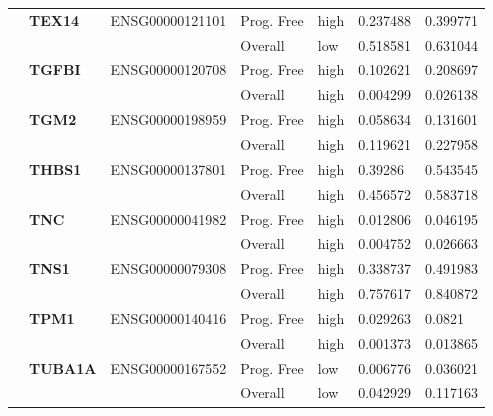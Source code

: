 \begin{spacing}{1}
{\begin{longtable}{|>{\bfseries}p{2cm}|>{\bfseries}p{1.9cm}|p{2.8cm}|p{2cm}|p{2cm}|p{1.5cm}|p{1.5cm}|}
             & TEX14    & ENSG00000121101 & Prog. Free & high & 0.237488 & 0.399771                \\
            \hhline{~~~----}
             &          &                 & Overall    & low  & 0.518581 & 0.631044                \\
            \hhline{~======}
             & TGFBI    & ENSG00000120708 & Prog. Free & high & 0.102621 & 0.208697                \\
            \hhline{~~~----}
             &          &                 & Overall    & high & 0.004299 & 0.026138                \\
            \hhline{~======}
             & TGM2     & ENSG00000198959 & Prog. Free & high & 0.058634 & 0.131601                \\
            \hhline{~~~----}
             &          &                 & Overall    & high & 0.119621 & 0.227958                \\
            \hhline{~======}
             & THBS1    & ENSG00000137801 & Prog. Free & high & 0.39286  & 0.543545                \\
            \hhline{~~~----}
             &          &                 & Overall    & high & 0.456572 & 0.583718                \\
            \hhline{~======}
             & TNC      & ENSG00000041982 & Prog. Free & high & 0.012806 & 0.046195                \\
            \hhline{~~~----}
             &          &                 & Overall    & high & 0.004752 & 0.026663                \\
            \hhline{~======}
             & TNS1     & ENSG00000079308 & Prog. Free & high & 0.338737 & 0.491983                \\
            \hhline{~~~----}
             &          &                 & Overall    & high & 0.757617 & 0.840872                \\
            \hhline{~======}
             & TPM1     & ENSG00000140416 & Prog. Free & high & 0.029263 & 0.0821                  \\
            \hhline{~~~----}
             &          &                 & Overall    & high & 0.001373 & 0.013865                \\
            \hhline{~======}
             & TUBA1A   & ENSG00000167552 & Prog. Free & low  & 0.006776 & 0.036021                \\
            \hhline{~~~----}
             &          &                 & Overall    & low  & 0.042929 & 0.117163                \\

\end{longtable}}
\end{spacing}
